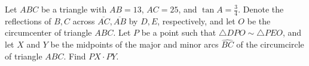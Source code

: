 Let $ABC$ be a triangle with $AB=13$, $AC=25$, and $\tan  A = \frac{3}{4}$. Denote the reflections of $B,C$ across $\overline{AC},\overline{AB}$ by $D,E$, respectively, and let $O$ be the circumcenter of triangle $ABC$. Let $P$ be a point such that $\triangle DPO\sim\triangle PEO$, and let $X$ and $Y$ be the midpoints of the major and minor arcs $\widehat{BC}$ of the circumcircle of triangle $ABC$. Find $PX \cdot PY$.
